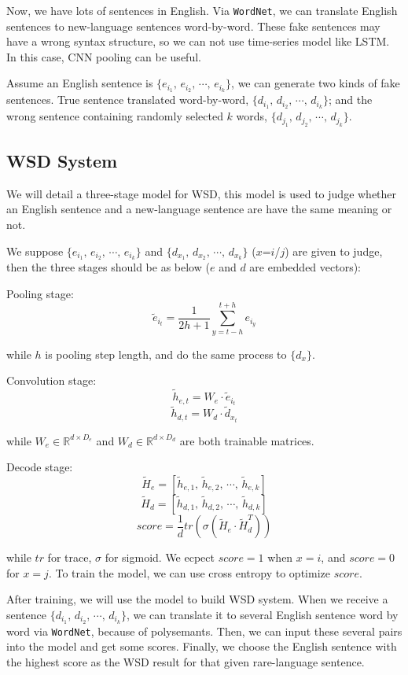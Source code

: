 \documentclass[11pt,a4paper]{article}
\begin{document}
Now, we have lots of sentences in English. Via \texttt{WordNet}, we can translate English sentences
to new-language sentences word-by-word. These fake sentences may have a wrong syntax structure, 
so we can not use time-series model like LSTM. In this case, CNN pooling can be useful.

Assume an English sentence is $\{e_{i_{1}},\,e_{i_{2}},\,\cdots,\,e_{i_{k}}\}$, we can 
generate two kinds of fake sentences. True sentence translated word-by-word, 
$\{d_{i_{1}},\,d_{i_{2}},\,\cdots,\,d_{i_{k}}\}$; and the wrong sentence containing randomly 
selected $k$ words, $\{d_{j_{1}},\,d_{j_{2}},\,\cdots,\,d_{j_{k}}\}$.

\subsection{WSD System}

We will detail a three-stage model for WSD, this model is used to judge whether an English sentence 
and a new-language sentence are have the same meaning or not. 

We suppose $\{e_{i_{1}},\,e_{i_{2}},\,\cdots,\,e_{i_{k}}\}$ and $\{d_{x_{1}},\,d_{x_{2}},\,\cdots,\,d_{x_{k}}\}$ 
($x$=$i$/$j$) are given to judge, then the three stages should be as below ($e$ and $d$ are embedded vectors):

Pooling stage:
$$\widetilde{e}_{i_{t}}=\frac{1}{2h+1}\sum_{y=t-h}^{t+h}e_{i_{y}}$$

while $h$ is pooling step length, and do the same process to $\{d_{x}\}$.

Convolution stage:
$$\widetilde{h}_{e,t}=W_{e}\cdot\widetilde{e}_{i_{t}}$$
$$\widetilde{h}_{d,t}=W_{d}\cdot\widetilde{d}_{x_{t}}$$

while $W_{e}\in \mathbb{R}^{d\times D_{e}}$ and $W_{d}\in \mathbb{R}^{d\times D_{d}}$ are both trainable matrices.

Decode stage:
$$\widetilde{H}_{e}=\left[\widetilde{h}_{e,1},\,\widetilde{h}_{e,2},\,\cdots,\,\widetilde{h}_{e,k}\right]$$
$$\widetilde{H}_{d}=\left[\widetilde{h}_{d,1},\,\widetilde{h}_{d,2},\,\cdots,\,\widetilde{h}_{d,k}\right]$$
$$score=\frac{1}{d}tr\left( \sigma\left(\widetilde{H}_{e}\cdot\widetilde{H}_{d}^{T}\right) \right)$$

while $tr$ for trace, $\sigma$ for sigmoid. We ecpect $score=1$ when $x=i$, and $score=0$ for $x=j$. 
To train the model, we can use cross entropy to optimize $score$.

After training, we will use the model to build WSD system. When we receive 
a sentence $\{d_{i_{1}},\,d_{i_{2}},\,\cdots,\,d_{i_{k}}\}$, we can translate 
it to several English sentence word by word via \texttt{WordNet}, because of 
polysemants. Then, we can input these several pairs into the model and get 
some scores. Finally, we choose the English sentence with the highest score 
as the WSD result for that given rare-language sentence.
\end{document}
